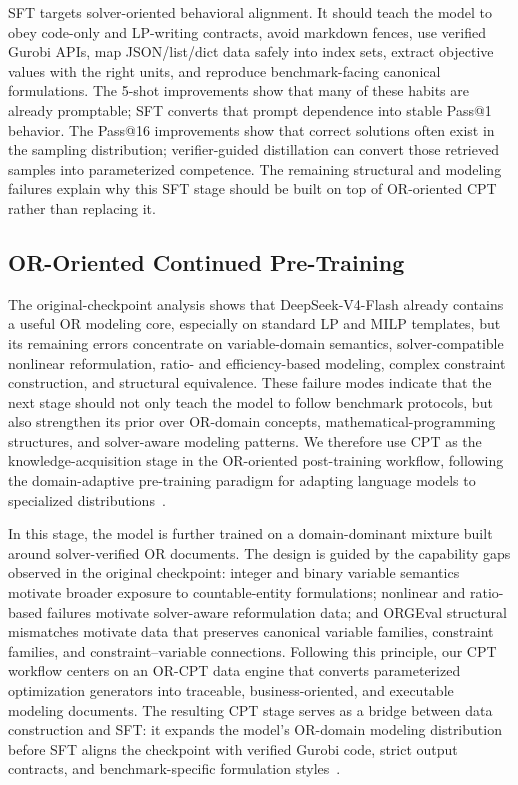 SFT targets solver-oriented behavioral alignment. It should teach the model
to obey code-only and LP-writing contracts, avoid markdown fences, use
verified Gurobi APIs, map JSON/list/dict data safely into index sets, extract
objective values with the right units, and reproduce benchmark-facing
canonical formulations. The 5-shot improvements show that many of these
habits are already promptable; SFT converts that prompt dependence into
stable Pass@1 behavior. The Pass@16 improvements show that correct solutions
often exist in the sampling distribution; verifier-guided distillation can
convert those retrieved samples into parameterized competence. The remaining
structural and modeling failures explain why this SFT stage should be built
on top of OR-oriented CPT rather than replacing it.

\subsection{OR-Oriented Continued Pre-Training}
\label{subsec:or_cpt}

The original-checkpoint analysis shows that DeepSeek-V4-Flash already contains
a useful OR modeling core, especially on standard LP and MILP templates, but
its remaining errors concentrate on variable-domain semantics,
solver-compatible nonlinear reformulation, ratio- and efficiency-based
modeling, complex constraint construction, and structural equivalence. These
failure modes indicate that the next stage should not only teach the model to
follow benchmark protocols, but also strengthen its prior over OR-domain
concepts, mathematical-programming structures, and solver-aware modeling
patterns. We therefore use CPT as the knowledge-acquisition stage in the
OR-oriented post-training workflow, following the domain-adaptive
pre-training paradigm for adapting language models to specialized
distributions~\citep{gururangan2020dontstop,chen2026continual_learning_llm}.

In this stage, the model is further trained on a domain-dominant mixture built
around solver-verified OR documents. The design is guided by the capability
gaps observed in the original checkpoint: integer and binary variable
semantics motivate broader exposure to countable-entity formulations;
nonlinear and ratio-based failures motivate solver-aware reformulation data;
and ORGEval structural mismatches motivate data that preserves canonical
variable families, constraint families, and constraint--variable connections.
Following this principle, our CPT workflow centers on an OR-CPT data engine
that converts parameterized optimization generators into traceable,
business-oriented, and executable modeling documents. The resulting CPT stage
serves as a bridge between data construction and SFT: it expands the model's
OR-domain modeling distribution before SFT aligns the checkpoint with verified
Gurobi code, strict output contracts, and benchmark-specific formulation
styles~\citep{jiang2025mix}.


